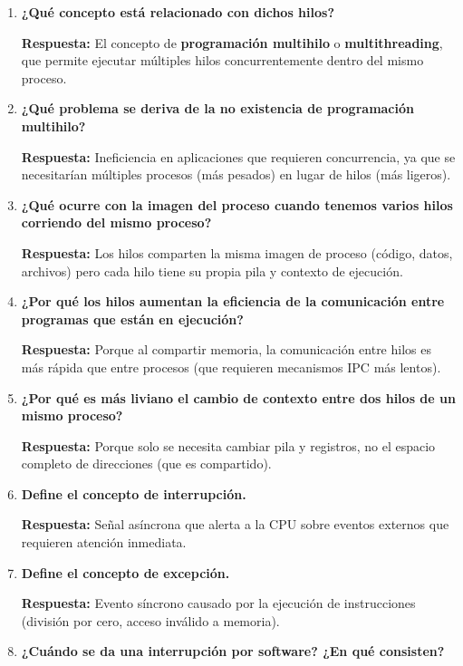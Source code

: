 \documentclass[a4paper,12pt]{article}
\begin{document}
\begin{enumerate}[label=\textbf{Pregunta \arabic*.},left=0pt,itemsep=1.5em]
\item \textbf{¿Qué concepto está relacionado con dichos hilos?}

\textbf{Respuesta:} El concepto de \textbf{programación multihilo} o \textbf{multithreading}, que permite ejecutar múltiples hilos concurrentemente dentro del mismo proceso.

\item \textbf{¿Qué problema se deriva de la no existencia de programación multihilo?}

\textbf{Respuesta:} Ineficiencia en aplicaciones que requieren concurrencia, ya que se necesitarían múltiples procesos (más pesados) en lugar de hilos (más ligeros).

\item \textbf{¿Qué ocurre con la imagen del proceso cuando tenemos varios hilos corriendo del mismo proceso?}

\textbf{Respuesta:} Los hilos comparten la misma imagen de proceso (código, datos, archivos) pero cada hilo tiene su propia pila y contexto de ejecución.

\item \textbf{¿Por qué los hilos aumentan la eficiencia de la comunicación entre programas que están en ejecución?}

\textbf{Respuesta:} Porque al compartir memoria, la comunicación entre hilos es más rápida que entre procesos (que requieren mecanismos IPC más lentos).

\item \textbf{¿Por qué es más liviano el cambio de contexto entre dos hilos de un mismo proceso?}

\textbf{Respuesta:} Porque solo se necesita cambiar pila y registros, no el espacio completo de direcciones (que es compartido).

\item \textbf{Define el concepto de interrupción.}

\textbf{Respuesta:} Señal asíncrona que alerta a la CPU sobre eventos externos que requieren atención inmediata.

\item \textbf{Define el concepto de excepción.}

\textbf{Respuesta:} Evento síncrono causado por la ejecución de instrucciones (división por cero, acceso inválido a memoria).

\item \textbf{¿Cuándo se da una interrupción por software? ¿En qué consisten?}


\end{enumerate}
\end{document}
